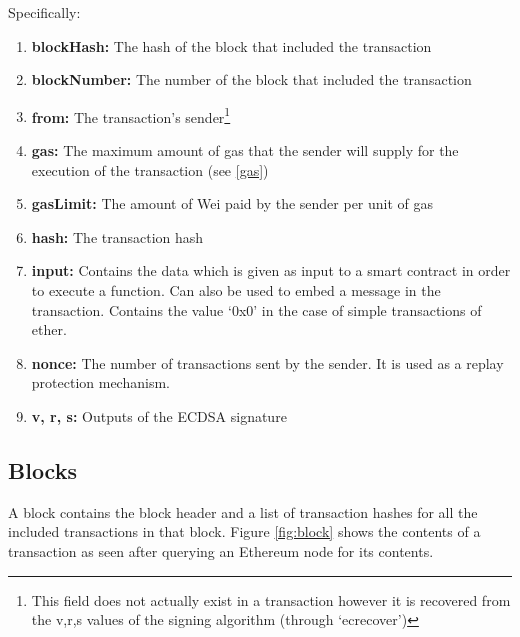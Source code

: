 
Specifically:
\begin{enumerate}
    \item \textbf{blockHash:} The hash of the block that included the transaction
    \item \textbf{blockNumber:} The number of the block that included the transaction
    \item \textbf{from:} The transaction's sender\footnote{This field does not actually exist in a transaction however it is recovered from the v,r,s values of the signing algorithm (through `ecrecover')}
    \item \textbf{gas:} The maximum amount of gas that the sender will supply for the execution of the transaction (see \ref{gas})
    \item \textbf{gasLimit:} The amount of Wei paid by the sender per unit of gas
    \item \textbf{hash:} The transaction hash
    \item \textbf{input:} Contains the data which is given as input to a smart contract in order to execute a function. Can also be used to embed a message in the transaction. Contains the value `0x0' in the case of simple transactions of ether.
    \item \textbf{nonce:} The number of transactions sent by the sender. It is used as a replay protection mechanism.
    \item \textbf{v, r, s:} Outputs of the ECDSA signature
\end{enumerate}

\subsection{Blocks} \label{block}
A block contains the block header and a list of transaction hashes for all the included transactions in that block. Figure \ref{fig:block} shows the contents of a transaction as seen after querying an Ethereum node for its contents.

